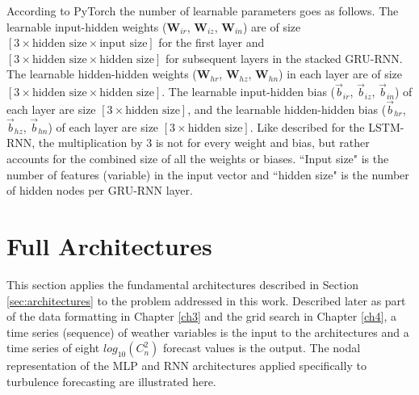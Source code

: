 According to PyTorch \cite{PyTorch} the number of learnable parameters goes as follows. The learnable input-hidden weights ($\textbf{W}_{ir}$, $\textbf{W}_{iz}$, $\textbf{W}_{in}$) are of size $\left[3 \times \text{hidden size} \times \text{input size}\right]$ for the first layer and $\left[3 \times \text{hidden size} \times \text{hidden size}\right]$ for subsequent layers in the stacked \ac{GRU-RNN}. The learnable hidden-hidden weights ($\textbf{W}_{hr}$, $\textbf{W}_{hz}$, $\textbf{W}_{hn}$) in each layer are of size $\left[3 \times \text{hidden size} \times \text{hidden size}\right]$. The learnable input-hidden bias ($\vec{b}_{ir}$, $\vec{b}_{iz}$, $\vec{b}_{in}$) of each layer are size $\left[3 \times \text{hidden size}\right]$, and the learnable hidden-hidden bias ($\vec{b}_{hr}$, $\vec{b}_{hz}$, $\vec{b}_{hn}$) of each layer are size $\left[3 \times \text{hidden size}\right]$. Like described for the \ac{LSTM-RNN}, the multiplication by 3 is not for every weight and bias, but rather accounts for the combined size of all the weights or biases. ``Input size" is the number of features (variable) in the input vector and ``hidden size" is the number of hidden nodes per \ac{GRU-RNN} layer.

\section{Full Architectures}
This section applies the fundamental architectures described in Section \ref{sec:architectures} to the problem addressed in this work. Described later as part of the data formatting in Chapter \ref{ch3} and the grid search in Chapter \ref{ch4}, a time series (sequence) of weather variables is the input to the architectures and a time series of eight $log_{10}(C_{n}^{2})$ forecast values is the output. The nodal representation of the \ac{MLP} and \ac{RNN} architectures applied specifically to turbulence forecasting are illustrated here.

